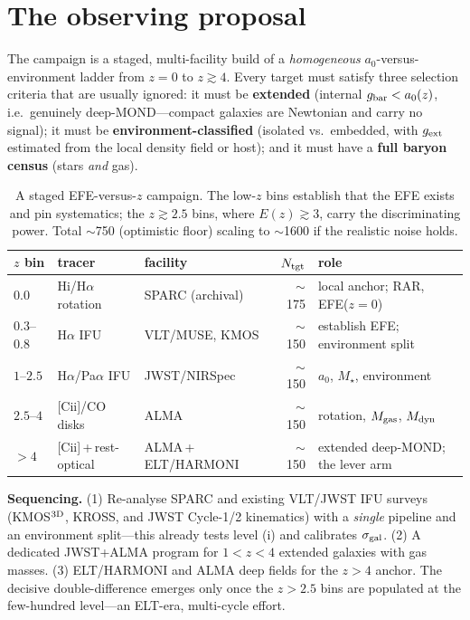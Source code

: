 \documentclass[11pt]{article}
\newcommand{\az}{a_0}
\newcommand{\gext}{g_{\rm ext}}
\newcommand{\gbar}{g_{\rm bar}}
\newcommand{\Ez}{E(z)}
\begin{document}
\section{The observing proposal}
The campaign is a staged, multi-facility build of a \emph{homogeneous}
$\az$-versus-environment ladder from $z=0$ to $z\gtrsim4$. Every target must satisfy
three selection criteria that are usually ignored: it must be \textbf{extended}
(internal $\gbar<\az(z)$, i.e.\ genuinely deep-MOND---compact galaxies are Newtonian
and carry no signal); it must be \textbf{environment-classified} (isolated vs.\
embedded, with $\gext$ estimated from the local density field or host); and it must
have a \textbf{full baryon census} (stars \emph{and} gas).

\begin{table}[h]
\centering
\small
\begin{tabular}{lllrl}
\hline
$z$ bin & tracer & facility & $N_{\rm tgt}$ & role \\
\hline
$0.0$ & H{\sc i}/H$\alpha$ rotation & SPARC (archival) & $\sim$175 & local anchor; RAR, EFE($z{=}0$)\\
$0.3$--$0.8$ & H$\alpha$ IFU & VLT/MUSE, KMOS & $\sim$150 & establish EFE; environment split\\
$1$--$2.5$ & H$\alpha$/Pa$\alpha$ IFU & JWST/NIRSpec & $\sim$150 & $\az$, $M_\star$, environment\\
$2.5$--$4$ & [C{\sc ii}]/CO disks & ALMA & $\sim$150 & rotation, $M_{\rm gas}$, $M_{\rm dyn}$\\
$>4$ & [C{\sc ii}]\,+\,rest-optical & ALMA\,+\,ELT/HARMONI & $\sim$150 & extended deep-MOND; the lever arm\\
\hline
\end{tabular}
\caption{A staged EFE-versus-$z$ campaign. The low-$z$ bins establish that the EFE
exists and pin systematics; the $z\gtrsim2.5$ bins, where $\Ez\gtrsim3$, carry the
discriminating power. Total $\sim$750 (optimistic floor) scaling to $\sim$1600 if the
realistic noise holds.}
\end{table}

\noindent
\textbf{Sequencing.} (1) Re-analyse SPARC and existing VLT/JWST IFU surveys
(KMOS$^{\rm 3D}$, KROSS, and JWST Cycle-1/2 kinematics) with a \emph{single} pipeline
and an environment split---this already tests level (i) and calibrates $\sigma_{\rm
gal}$. (2) A dedicated JWST+ALMA program for $1<z<4$ extended galaxies with gas
masses. (3) ELT/HARMONI and ALMA deep fields for the $z>4$ anchor. The decisive
double-difference emerges only once the $z>2.5$ bins are populated at the few-hundred
level---an ELT-era, multi-cycle effort.
\end{document}
